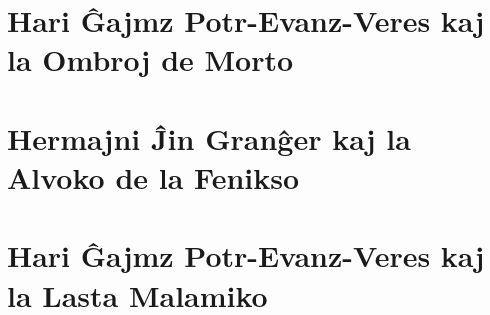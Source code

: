 \part{Hari Ĝajmz Potr-Evanz-Veres kaj la Ombroj de Morto}
% 
% 
% 
% 
% 
% 
% 
% 
% 
% 

% 
% 
% 
% 
% 
% 
% 
% 
% 
% 
% 
% 
% 
% 
% 
\part{Hermajni Ĵin Granĝer kaj la Alvoko de la Fenikso}
% 
% 
% 
% 
% 
% 
% 
% 
% 
% 
% 
% 
% 
% 
% 
% 
% 
% 
% 
% 
% 
\part{Hari Ĝajmz Potr-Evanz-Veres kaj la Lasta Malamiko}
% 
% 
% 
% 
% 
% 
% 
% 
% 
% 
% 
% 
% 

